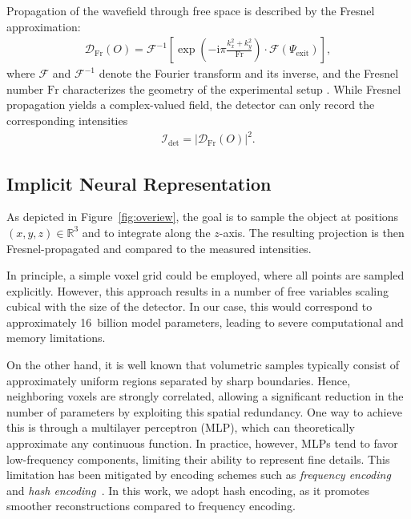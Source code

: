 \documentclass{article}
\begin{document}
Propagation of the wavefield through free space is described by the Fresnel approximation:  
\begin{align}
	\mathcal{D}_{\text{Fr}} \left( O \right) = 
	\mathcal{F}^{-1} \left[ 
		\exp \left( - \mathrm{i} \pi \frac{k_{x}^{2} + k_{y}^{2}}{\text{Fr}} \right) 
		\cdot \mathcal{F} \left( \Psi_{\text{exit}} \right)
	\right],
	\label{eq:fresnel}
\end{align}
where $\mathcal{F}$ and $\mathcal{F}^{-1}$ denote the Fourier transform and its inverse, and the Fresnel number $\text{Fr}$ characterizes the geometry of the experimental setup \cite{paganinCoherentXrayOptics2006a}.
While Fresnel propagation yields a complex-valued field, the detector can only record the corresponding intensities
\begin{align}
	\mathcal{I}_{\text{det}} = \left| \mathcal{D}_{\text{Fr}} \left( O \right) \right|^{2}.
\end{align}

\subsection{Implicit Neural Representation}
As depicted in Figure~\ref{fig:overiew}, the goal is to sample the object at positions $\left( x,y,z \right) \in \mathbb{R}^{3}$ and to integrate along the $z$-axis.  
The resulting projection is then Fresnel-propagated and compared to the measured intensities.  

In principle, a simple voxel grid could be employed, where all points are sampled explicitly.  
However, this approach results in a number of free variables scaling cubical with the size of the detector.  
In our case, this would correspond to approximately 16~billion model parameters, leading to severe computational and memory limitations.  

On the other hand, it is well known that volumetric samples typically consist of approximately uniform regions separated by sharp boundaries.  
Hence, neighboring voxels are strongly correlated, allowing a significant reduction in the number of parameters by exploiting this spatial redundancy.  
One way to achieve this is through a multilayer perceptron (MLP), which can theoretically approximate any continuous function.  
In practice, however, MLPs tend to favor low-frequency components, limiting their ability to represent fine details.  
This limitation has been mitigated by encoding schemes such as \emph{frequency encoding} and \emph{hash encoding}~\cite{mullerInstantNeuralGraphics2022,mildenhallNeRFRepresentingScenes2020a}.  
In this work, we adopt hash encoding, as it promotes smoother reconstructions compared to frequency encoding.  
\end{document}
